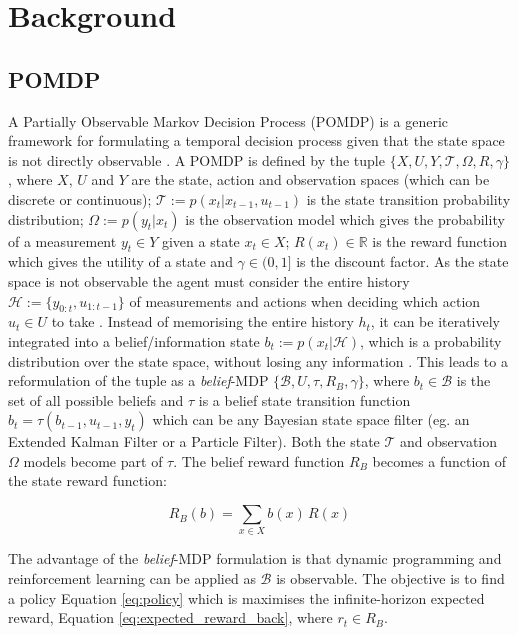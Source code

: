 \documentclass[final,5p,times,twocolumn]{elsarticle}
\begin{document}
\section{Background}\label{sec:related_work}

\subsection{POMDP}

A Partially Observable Markov Decision Process (POMDP) is a generic framework for formulating a temporal decision process 
given that the state space is not directly observable \cite{Sondik_1973}. A POMDP is defined by the tuple $\{X,U,Y,\mathcal{T},\Omega,R,\gamma\}$, 
where $X$, $U$ and $Y$ are the state, action and observation spaces (which can be discrete or continuous);
${\mathcal{T}:= p(x_t|x_{t-1},u_{t-1})}$ is the state transition probability distribution; $\Omega := p(y_t|x_t)$ is 
the observation model which gives the probability of a measurement $y_t \in Y$ given a state $x_t \in X$; 
$R(x_t) \in \mathbb{R}$ is the reward function which gives the utility of a state and $\gamma \in (0,1]$ is the discount factor. As the state space is not 
observable the agent must consider the entire history $\mathcal{H}:= \{y_{0:t},u_{1:t-1}\}$ of measurements and actions
when deciding which action $u_t \in U$ to take \cite{Ross08onlineplanning}. Instead of memorising the entire history $h_t$, 
it can be iteratively integrated into a belief/information state ${b_t := p(x_t|\mathcal{H})}$, which 
is a probability distribution over the state space, without losing any information \cite{Milos_POMDP_2000}.
This leads to a reformulation of the tuple as a \textit{belief}-MDP $\{\mathcal{B},U,\tau,R_B,\gamma\}$, where $b_t \in \mathcal{B}$ is 
the set of all possible beliefs and $\tau$ is a belief state transition function $b_t = \tau(b_{t-1},u_{t-1},y_t)$ 
which can be any Bayesian state space filter (eg. an Extended Kalman Filter or a Particle Filter). Both the state $\mathcal{T}$ and observation 
$\Omega$ models become part of $\tau$. The belief reward function $R_B$ becomes a function of the state reward function:

\begin{equation}\label{eq:bel_reward_back}
  R_B(b) = \sum\limits_{x \in X} b(x)\, R(x)
\end{equation}

The advantage of the \textit{belief}-MDP formulation is that dynamic programming and reinforcement
learning can be applied as $\mathcal{B}$ is observable.  The objective is to find a 
policy Equation \ref{eq:policy} which is maximises the infinite-horizon expected reward, Equation 
\ref{eq:expected_reward_back}, where $r_t \in R_B$. 
\end{document}
